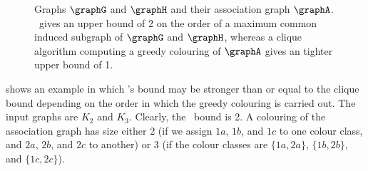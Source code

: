 \begin{figure}[htb]
\centering
{}
\qquad\quad
{}
\qquad\quad
{}
\qquad

\caption{Graphs $\graphG$ and $\graphH$ and their association graph $\graphA$.  \McSplit\
    gives an upper bound of 2 on the order of a maximum common induced subgraph
    of $\graphG$ and $\graphH$, whereas a clique algorithm computing
    a greedy colouring of $\graphA$ gives an tighter upper bound of 1.}
\label{fig:clique-better-bound}
\end{figure}

 shows an example in which \McSplit's bound
may be stronger than or equal to the clique bound depending on the order in
which the greedy colouring is carried out.  The input graphs are $K_2$ and
$K_3$.  Clearly, the \McSplit\ bound is 2.  A colouring of the association
graph has size either 2 (if we assign $1a$, $1b$, and $1c$
to one colour class, and $2a$, $2b$, and $2c$ to another) or 3 (if the
colour classes are $\{1a,2a\}$, $\{1b,2b\}$, and $\{1c,2c\}$).

